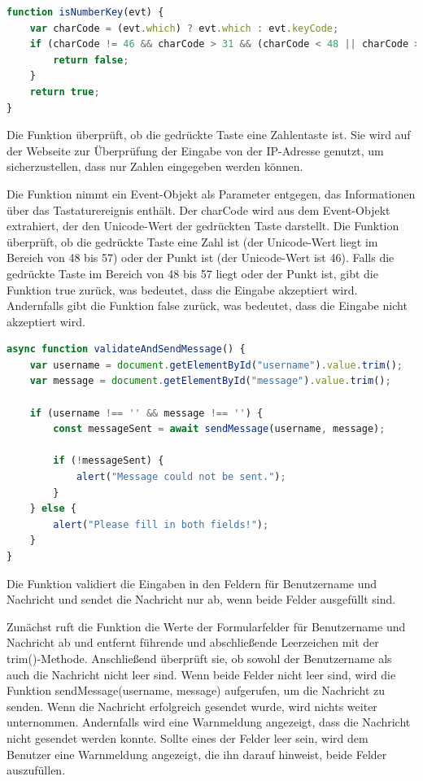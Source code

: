 \begin{lstlisting}[language=JavaScript, caption={Javascript | Überprüfung, ob die Eingabe eine Zahl oder "." ist}]
function isNumberKey(evt) {
    var charCode = (evt.which) ? evt.which : evt.keyCode;
    if (charCode != 46 && charCode > 31 && (charCode < 48 || charCode > 57)) {
        return false;
    }
    return true;
}
\end{lstlisting}

Die Funktion überprüft, ob die gedrückte Taste eine Zahlentaste ist. Sie wird auf der Webseite zur Überprüfung der Eingabe
von der IP-Adresse genutzt, um sicherzustellen, dass nur Zahlen eingegeben werden können.

Die Funktion nimmt ein Event-Objekt als Parameter entgegen, das Informationen über das Tastaturereignis enthält. Der
charCode wird aus dem Event-Objekt extrahiert, der den Unicode-Wert der gedrückten Taste darstellt. Die Funktion überprüft,
ob die gedrückte Taste eine Zahl ist (der Unicode-Wert liegt im Bereich von 48 bis 57) oder der Punkt ist (der Unicode-Wert
ist 46). Falls die gedrückte Taste im Bereich von 48 bis 57 liegt oder der Punkt ist, gibt die Funktion true zurück, was
bedeutet, dass die Eingabe akzeptiert wird. Andernfalls gibt die Funktion false zurück, was bedeutet, dass die Eingabe
nicht akzeptiert wird.

\begin{lstlisting}[language=JavaScript, caption={Javascript | Validierung und Senden der Message}]
async function validateAndSendMessage() {
    var username = document.getElementById("username").value.trim();
    var message = document.getElementById("message").value.trim();

    if (username !== '' && message !== '') {
        const messageSent = await sendMessage(username, message);

        if (!messageSent) {
            alert("Message could not be sent.");
        }
    } else {
        alert("Please fill in both fields!");
    }
}
\end{lstlisting}

Die Funktion validiert die Eingaben in den Feldern für Benutzername und Nachricht und sendet die Nachricht nur ab, wenn
beide Felder ausgefüllt sind.

Zunächst ruft die Funktion die Werte der Formularfelder für Benutzername und Nachricht ab und entfernt führende und
abschließende Leerzeichen mit der trim()-Methode. Anschließend überprüft sie, ob sowohl der Benutzername als auch die
Nachricht nicht leer sind. Wenn beide Felder nicht leer sind, wird die Funktion sendMessage(username, message) aufgerufen,
um die Nachricht zu senden. Wenn die Nachricht erfolgreich gesendet wurde, wird nichts weiter unternommen. Andernfalls wird
eine Warnmeldung angezeigt, dass die Nachricht nicht gesendet werden konnte. Sollte eines der Felder leer sein, wird dem
Benutzer eine Warnmeldung angezeigt, die ihn darauf hinweist, beide Felder auszufüllen.


